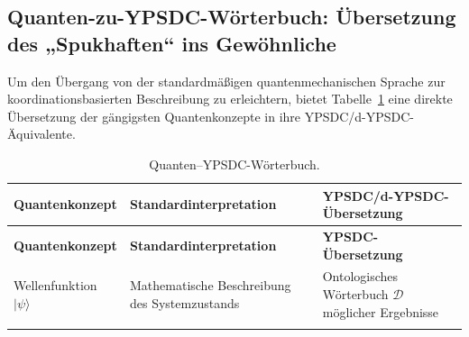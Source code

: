\documentclass[12pt,a4paper]{article}
\theoremstyle{remark}
\begin{document}
	\subsection{Quanten-zu-YPSDC-Wörterbuch: Übersetzung des „Spukhaften“ ins Gewöhnliche}
	
	Um den Übergang von der standardmäßigen quantenmechanischen Sprache zur koordinationsbasierten Beschreibung zu erleichtern, bietet Tabelle~\ref{tab:quantum-dict} eine direkte Übersetzung der gängigsten Quantenkonzepte in ihre YPSDC/d-YPSDC-Äquivalente.
	
	\begin{longtable}{p{3.8cm} p{5cm} p{7cm}}
		\caption{Quanten–YPSDC-Wörterbuch.}\label{tab:quantum-dict}\\
		\toprule
		\textbf{Quantenkonzept} & \textbf{Standardinterpretation} & \textbf{YPSDC/d-YPSDC-Übersetzung} \\
		\midrule
		\endfirsthead
		
		\toprule
		\textbf{Quantenkonzept} & \textbf{Standardinterpretation} & \textbf{YPSDC-Übersetzung} \\
		\midrule
		\endhead
		
		\hline
		\endfoot
		
		\bottomrule
		\endlastfoot
		
		Wellenfunktion \(|\psi\rangle\) &
		Mathematische Beschreibung des Systemzustands &
		Ontologisches Wörterbuch \(\mathcal{D}\) möglicher Ergebnisse \\
		\addlinespace
		

\end{longtable}
\end{document}
